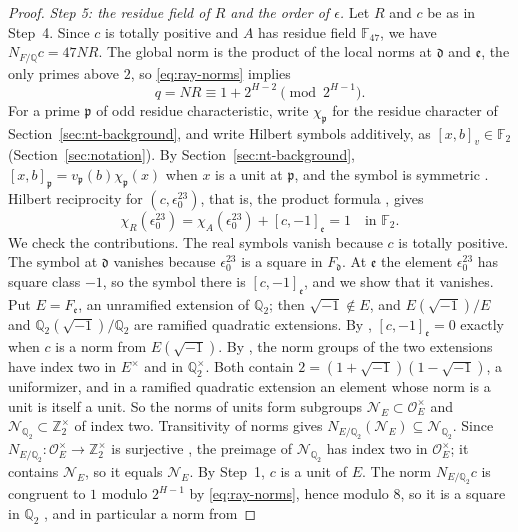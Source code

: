 \documentclass[11pt]{article}
\theoremstyle{plain}
\theoremstyle{definition}
\theoremstyle{remark}
\newcommand{\Z}{\mathbb Z}
\newcommand{\Q}{\mathbb Q}
\newcommand{\F}{\mathbb F}
\newcommand{\OO}{\mathcal O}
\begin{document}
\begin{proof}
\emph{Step 5: the residue field of $R$ and the order of $\epsilon$.}  Let
$R$ and $c$ be as in Step~4.  Since $c$ is totally positive and $A$ has
residue field $\F_{47}$, we have $N_{F/\Q}c=47NR$.  The global norm is the
product of the local norms at $\mathfrak d$ and $\mathfrak e$, the only
primes above $2$, so \eqref{eq:ray-norms} implies
\[
 q=NR\equiv1+2^{H-2}\pmod{2^{H-1}}.
\]
For a prime $\mathfrak p$ of odd residue characteristic, write
$\chi_{\mathfrak p}$ for the residue character of
Section~\ref{sec:nt-background}, and write Hilbert symbols additively, as
$[x,b]_v\in\F_2$ (Section~\ref{sec:notation}).  By
Section~\ref{sec:nt-background}, $[x,b]_{\mathfrak p}=v_{\mathfrak p}(b)\chi_{\mathfrak p}(x)$ when
$x$ is a unit at $\mathfrak p$, and the symbol is symmetric
\cite[Chapter~III, Theorem~4.4(b)]{MilneCFT}.  Hilbert reciprocity for
$(c,\epsilon_0^{23})$, that is, the product formula \cite[Chapter~V,
Example~5.4]{MilneCFT}, gives
\[
 \chi_R(\epsilon_0^{23})=\chi_A(\epsilon_0^{23})+[c,-1]_{\mathfrak e}=1
 \quad\text{in }\F_2.
\]
We check the contributions.  The real symbols vanish because $c$ is
totally positive.  The symbol at $\mathfrak d$ vanishes because
$\epsilon_0^{23}$ is a square in $F_{\mathfrak d}$.  At $\mathfrak e$ the
element $\epsilon_0^{23}$ has square class $-1$, so the symbol there is
$[c,-1]_{\mathfrak e}$, and we show that it vanishes.  Put
$E=F_{\mathfrak e}$, an unramified extension of $\Q_2$; then
$\sqrt{-1}\notin E$, and $E(\sqrt{-1})/E$ and $\Q_2(\sqrt{-1})/\Q_2$ are
ramified quadratic extensions.  By \cite[Chapter~III,
Theorem~4.4(b),(d)]{MilneCFT}, $[c,-1]_{\mathfrak e}=0$ exactly when $c$
is a norm from $E(\sqrt{-1})$.  By \cite[Chapter~III,
Theorem~3.4(b)]{MilneCFT}, the norm groups of the two extensions have
index two in $E^\times$ and in $\Q_2^\times$.  Both contain
$2=(1+\sqrt{-1})(1-\sqrt{-1})$, a uniformizer, and in a ramified
quadratic extension an element whose norm is a unit is itself a unit.  So
the norms of units form subgroups $\mathcal N_E\subset\OO_E^\times$ and
$\mathcal N_{\Q_2}\subset\Z_2^\times$ of index two.  Transitivity of
norms gives $N_{E/\Q_2}(\mathcal N_E)\subseteq\mathcal N_{\Q_2}$.  Since
$N_{E/\Q_2}\colon\OO_E^\times\to\Z_2^\times$ is surjective
\cite[Chapter~III, Proposition~1.2]{MilneCFT}, the preimage of
$\mathcal N_{\Q_2}$ has index two in $\OO_E^\times$; it contains
$\mathcal N_E$, so it equals $\mathcal N_E$.  By Step~1, $c$ is a unit
of $E$.  The norm $N_{E/\Q_2}c$ is congruent to $1$ modulo $2^{H-1}$ by
\eqref{eq:ray-norms}, hence modulo $8$, so it is a square in $\Q_2$
\cite[Theorem~7.32]{MilneANT}, and in particular a norm from

\end{proof}
\end{document}
